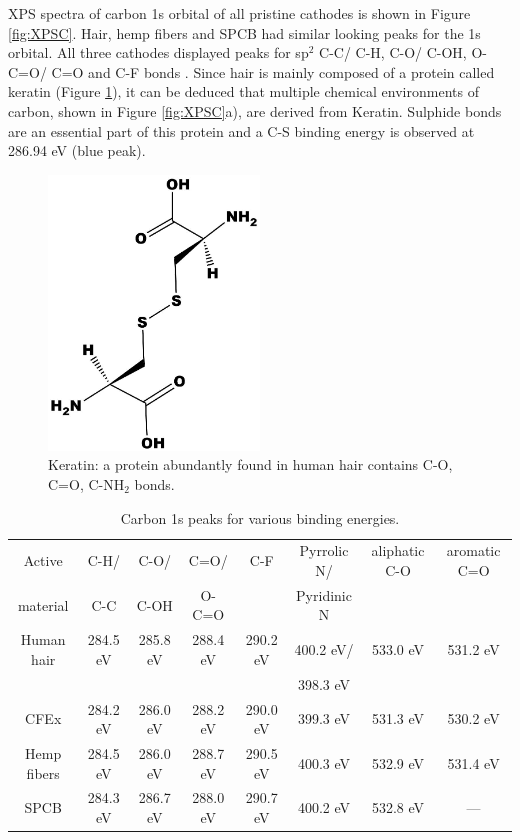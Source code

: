 \documentclass{article}
\begin{document}
XPS spectra of carbon 1s orbital of all pristine cathodes is shown in Figure \ref{fig:XPSC}. Hair, hemp fibers and SPCB had similar looking peaks for the 1s orbital. All three cathodes displayed peaks for sp$^2$ C-C/ C-H, C-O/ C-OH, O-C=O/ C=O and C-F bonds . Since hair is mainly composed of a protein called keratin (Figure \ref{fig:keratin}), it can be deduced that multiple chemical environments of carbon, shown in Figure \ref{fig:XPSC}a), are derived from Keratin. Sulphide bonds are an essential part of this protein and a C-S binding energy is observed at 286.94 eV (blue peak).

\begin{figure}[th!]
\centering
\includegraphics[width=0.5\textwidth]{fig/keratin}
\caption{Keratin: a protein abundantly found in human hair contains C-O, C=O, C-NH$_2$ bonds.}
\label{fig:keratin}
\end{figure}

\begin{table}
\caption{Carbon 1s peaks for various binding energies.} \label{table2}
\begin{tabular}{|cccccccc|}
\hline
Active & C-H/ & C-O/ & C=O/ & C-F & Pyrrolic N/ & aliphatic C-O & aromatic C=O\\
material & C-C & C-OH & O-C=O & & Pyridinic N & & \\
\hline
Human hair & 284.5 eV & 285.8 eV & 288.4 eV & 290.2 eV & 400.2 eV/ & 533.0 eV & 531.2 eV\\
& & & & & 398.3 eV & & \\
CFEx & 284.2 eV & 286.0 eV & 288.2 eV & 290.0 eV & 399.3 eV & 531.3 eV & 530.2 eV\\
Hemp fibers & 284.5 eV & 286.0 eV & 288.7 eV & 290.5 eV & 400.3 eV & 532.9 eV & 531.4 eV\\
SPCB & 284.3 eV & 286.7 eV & 288.0 eV & 290.7 eV & 400.2 eV & 532.8 eV & ---\\
\hline
\end{tabular}
\end{table}
\end{document}
